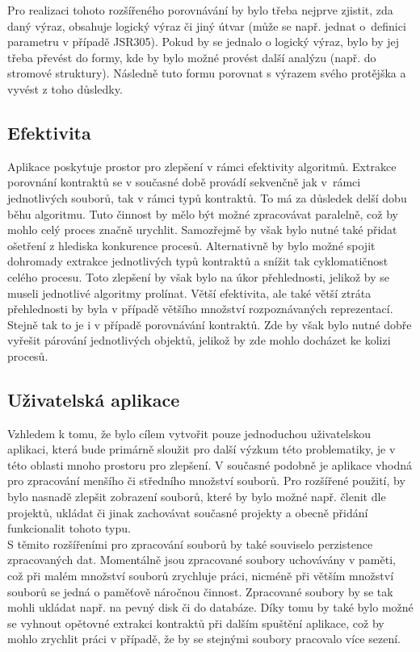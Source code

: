 			Pro realizaci tohoto rozšířeného porovnávání by bylo třeba nejprve zjistit, zda daný výraz, obsahuje logický výraz či jiný útvar (může se např. jednat o~definici parametru v případě JSR305). Pokud by se jednalo o logický výraz, bylo by jej třeba převést do formy, kde by bylo možné provést další analýzu (např. do stromové struktury). Následně tuto formu porovnat s výrazem svého protějška a vyvést z toho důsledky.
  		
  		\subsection{Efektivita}
	  		Aplikace poskytuje prostor pro zlepšení v rámci efektivity algoritmů. Extrakce porovnání kontraktů se v současné době provádí sekvenčně jak v~rámci jednotlivých souborů, tak v rámci typů kontraktů. To má za důsledek delší dobu běhu algoritmu. Tuto činnost by mělo být možné zpracovávat paralelně, což by mohlo celý proces značně urychlit. Samozřejmě by však bylo nutné také přidat ošetření z hlediska konkurence procesů. Alternativně by bylo možné spojit dohromady extrakce jednotlivých typů kontraktů a snížit tak cyklomatičnost celého procesu. Toto zlepšení by však bylo na úkor přehlednosti, jelikož by se museli jednotlivé algoritmy prolínat. Větší efektivita, ale také větší ztráta přehlednosti by byla v případě většího množství rozpoznávaných reprezentací.\\
	  		
	  		Stejně tak to je i v případě porovnávání kontraktů. Zde by však bylo nutné dobře vyřešit párování jednotlivých objektů, jelikož by zde mohlo docházet ke kolizi procesů.
  		
  		\subsection{Uživatelská aplikace}
  			Vzhledem k tomu, že bylo cílem vytvořit pouze jednoduchou uživatelskou aplikaci, která bude primárně sloužit pro další výzkum této problematiky, je v této oblasti mnoho prostoru pro zlepšení. V současné podobně je aplikace vhodná pro zpracování menšího či středního množství souborů. Pro rozšířené použití, by bylo nasnadě zlepšit zobrazení souborů, které by bylo možné např. členit dle projektů, ukládat či jinak zachovávat současné projekty a obecně přidání funkcionalit tohoto typu.\\ 
  			
  			S těmito rozšířeními pro zpracování souborů by také souviselo perzistence zpracovaných dat. Momentálně jsou zpracované soubory uchovávány v paměti, což při malém množství souborů zrychluje práci, nicméně při větším množství souborů se jedná o paměťově náročnou činnost. Zpracované soubory by se tak mohli ukládat např. na pevný disk či do databáze. Díky tomu by také bylo možné se vyhnout opětovné extrakci kontraktů při dalším spuštění aplikace, což by mohlo zrychlit práci v případě, že by se stejnými soubory pracovalo více sezení.\\
  			
